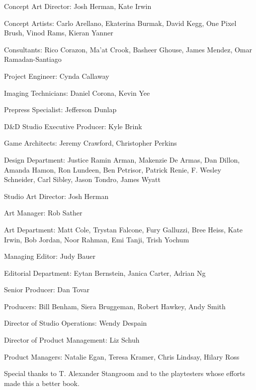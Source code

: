 \documentclass[10pt,a4paper,twoside,bg=print,twocolumn,openany,nodeprecatedcode]{dndbook}
\begin{document}
\begin{description}
\begin{multicols}{2}
\item[Concept Art Director:]
Josh Herman, Kate Irwin

\item[Concept Artists:]
Carlo Arellano, Ekaterina Burmak, David Kegg, One Pixel Brush, Vinod Rams, Kieran Yanner

\item[Consultants:]
Rico Corazon, Ma'at Crook, Basheer Ghouse, James Mendez, Omar Ramadan-Santiago

\item[Project Engineer:]
Cynda Callaway

\item[Imaging Technicians:]
Daniel Corona, Kevin Yee

\item[Prepress Specialist:]
Jefferson Dunlap

\item[D\&D Studio Executive Producer:]
Kyle Brink

\item[Game Architects:]
Jeremy Crawford, Christopher Perkins

\item[Design Department:]
Justice Ramin Arman, Makenzie De Armas, Dan Dillon, Amanda Hamon, Ron Lundeen, Ben Petrisor, Patrick Renie, F. Wesley Schneider, Carl Sibley, Jason Tondro, James Wyatt

\item[Studio Art Director:]
Josh Herman

\item[Art Manager:]
Rob Sather

\item[Art Department:]
Matt Cole, Trystan Falcone, Fury Galluzzi, Bree Heiss, Kate Irwin, Bob Jordan, Noor Rahman, Emi Tanji, Trish Yochum

\item[Managing Editor:]
Judy Bauer

\item[Editorial Department:]
Eytan Bernstein, Janica Carter, Adrian Ng

\item[Senior Producer:]
Dan Tovar

\item[Producers:]
Bill Benham, Siera Bruggeman, Robert Hawkey, Andy Smith

\item[Director of Studio Operations:]
Wendy Despain

\item[Director of Product Management:]
Liz Schuh

\item[Product Managers:]
Natalie Egan, Teresa Kramer, Chris Lindsay, Hilary Ross

\item Special thanks to T. Alexander Stangroom and to the playtesters whose efforts made this a better book.
\end{multicols}

\end{description}
\end{document}
